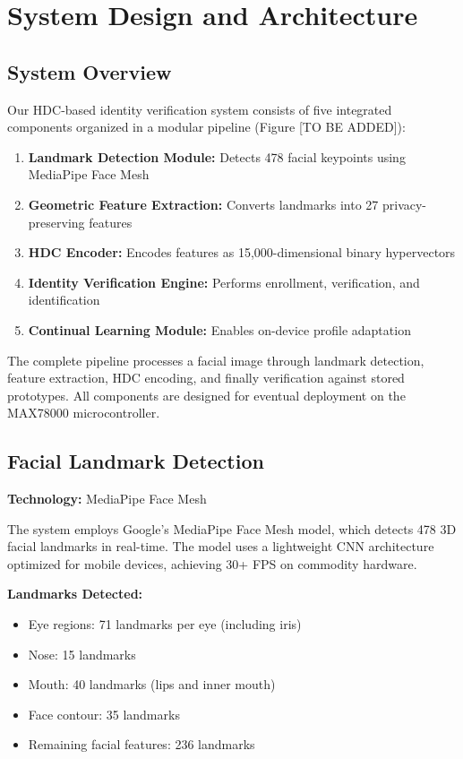 \documentclass[a4paper,12pt]{article}
\begin{document}
\newpage

\section{System Design and Architecture}

\subsection{System Overview}

Our HDC-based identity verification system consists of five integrated components organized in a modular pipeline (Figure [TO BE ADDED]):

\begin{enumerate}
    \item \textbf{Landmark Detection Module:} Detects 478 facial keypoints using MediaPipe Face Mesh
    \item \textbf{Geometric Feature Extraction:} Converts landmarks into 27 privacy-preserving features
    \item \textbf{HDC Encoder:} Encodes features as 15,000-dimensional binary hypervectors
    \item \textbf{Identity Verification Engine:} Performs enrollment, verification, and identification
    \item \textbf{Continual Learning Module:} Enables on-device profile adaptation
\end{enumerate}

The complete pipeline processes a facial image through landmark detection, feature extraction, HDC encoding, and finally verification against stored prototypes. All components are designed for eventual deployment on the MAX78000 microcontroller.

\subsection{Facial Landmark Detection}

\textbf{Technology:} MediaPipe Face Mesh

The system employs Google's MediaPipe Face Mesh model, which detects 478 3D facial landmarks in real-time. The model uses a lightweight CNN architecture optimized for mobile devices, achieving 30+ FPS on commodity hardware.

\textbf{Landmarks Detected:}
\begin{itemize}
    \item Eye regions: 71 landmarks per eye (including iris)
    \item Nose: 15 landmarks
    \item Mouth: 40 landmarks (lips and inner mouth)
    \item Face contour: 35 landmarks
    \item Remaining facial features: 236 landmarks
\end{itemize}
\end{document}
